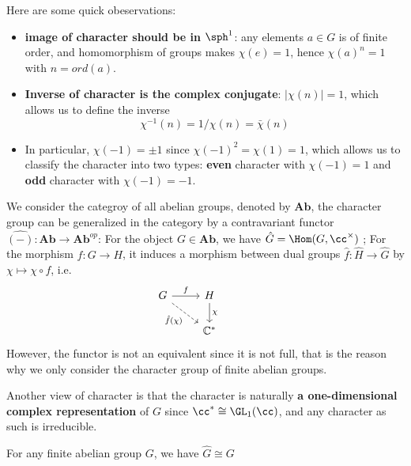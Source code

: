 Here are some quick obeservations:
\begin{itemize}
        \item \textbf{image of character should be in \(\sph^1\)}: any elements \(a \in G\) is of finite order, and homomorphism of groups makes \(\chi(e) = 1\), hence \(\chi(a)^n = 1\) with \(n = ord(a)\).
    \item \textbf{Inverse of character is the complex conjugate}: \(|\chi(n)| = 1\), which allows us to define the inverse
    \[\chi^{-1}(n) = 1/\chi(n) = \bar{\chi}(n)\]
    \item In particular, \(\chi(-1) = \pm 1\) since \(\chi(-1)^2 = \chi(1) = 1\), which allows us to classify the character into two types: \textbf{even} character with \(\chi(-1) = 1\) and \textbf{odd} character with \(\chi(-1) = -1\).
\end{itemize}
\begin{remark}
    We consider the categroy of all abelian groups, denoted by \(\mathbf{Ab}\), the character group can be generalized in the category by a contravariant functor \(\hat{(-)}: \mathbf{Ab} \to \mathbf{Ab}^{op}\): For the object \(G \in \mathbf{Ab}\), we have \(\hat{G} = \Hom(G, \cc^\times)\) ; For the morphism \(f:G \to H\), it induces a morphism between dual groups \(\hat{f}: \hat{H} \to \hat{G}\) by \(\chi \mapsto \chi \circ f\), i.e.
\[\begin{tikzcd}
	G & H & {} \\
	& {\mathbb{C}^*}
	\arrow["f", from=1-1, to=1-2]
	\arrow["{\hat{f}(\chi)}"', dashed, from=1-1, to=2-2]
	\arrow["\chi", from=1-2, to=2-2]
\end{tikzcd}\]
    However, the functor is not an equivalent since it is not full, that is the reason why we only consider the character group of finite abelian groups.
\end{remark}

\begin{remark}
    Another view of character is that the character is naturally \textbf{a one-dimensional complex representation} of \(G\) since \(\cc^* \cong \GL_1(\cc)\), and any character as such is irreducible.
\end{remark}


\begin{proposition}
    For any finite abelian group \(G\), we have \(\hat{G} \cong G\)
\end{proposition}

